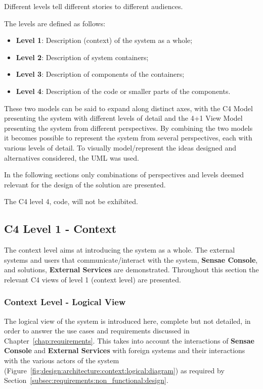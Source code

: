 Different levels tell different stories to different audiences.

The levels are defined as follows:

\begin{itemize}
   \item \textbf{Level 1}: Description (context) of the system as a whole;
   \item \textbf{Level 2}: Description of system containers;
   \item \textbf{Level 3}: Description of components of the containers;
   \item \textbf{Level 4}: Description of the code or smaller parts of the components.
\end{itemize}

These two models can be said to expand along distinct axes, with the C4 Model presenting the system with different levels of detail and the 4+1 View Model presenting the system from different perspectives. By combining the two models it becomes possible to represent the system from several perspectives, each with various levels of detail.
To visually model/represent the ideas designed and alternatives considered, the \gls{UML} was used.

In the following sections only combinations of perspectives and levels deemed relevant for the design of the solution are presented.

The C4 level 4, code, will not be exhibited.

\subsection{C4 Level 1 - Context}
\label{subsec:design:architecture:context}

The context level aims at introducing the system as a whole. The external systems and users that communicate/interact with the system, \textbf{Sensae Console}, and solutions, \textbf{External Services} are demonstrated.
Throughout this section the relevant C4 views of level 1 (context level) are presented.

\subsubsection{Context Level - Logical View}
\label{subsubsec:design:architecture:context:logical}

The logical view of the system is introduced here, complete but not detailed, in order to answer the use cases and requirements discussed in Chapter~\ref{chap:requirements}. This takes into account the interactions of \textbf{Sensae Console} and \textbf{External Services} with foreign systems and their interactions with the various actors of the system (Figure~\ref{fig:design:architecture:context:logical:diagram}) as required by Section~\ref{subsec:requirements:non_functional:design}.

